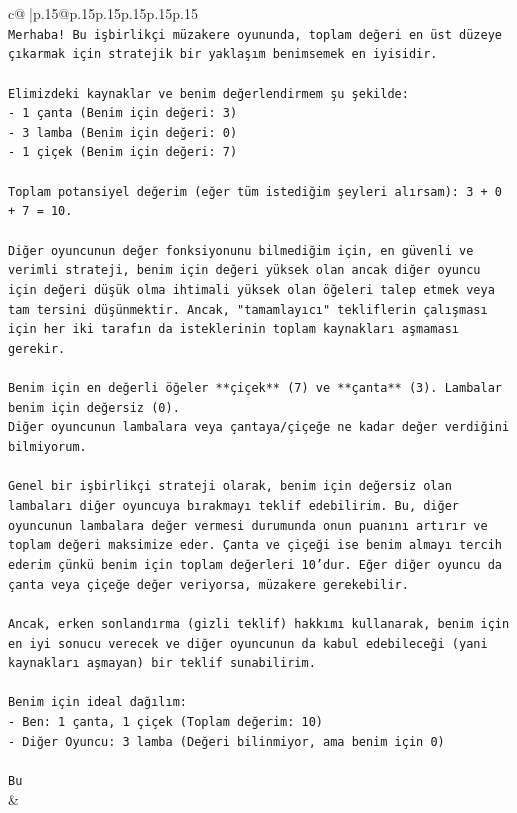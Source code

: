 \documentclass{article}
\begin{document}
{\begin{supertabular}{c@{$\;$}|p{.15\linewidth}@{}p{.15\linewidth}p{.15\linewidth}p{.15\linewidth}p{.15\linewidth}p{.15\linewidth}}
{{{\\ 
\texttt{Merhaba! Bu işbirlikçi müzakere oyununda, toplam değeri en üst düzeye çıkarmak için stratejik bir yaklaşım benimsemek en iyisidir.} \\
\\ 
\texttt{Elimizdeki kaynaklar ve benim değerlendirmem şu şekilde:} \\
\texttt{{-} 1 çanta (Benim için değeri: 3)} \\
\texttt{{-} 3 lamba (Benim için değeri: 0)} \\
\texttt{{-} 1 çiçek (Benim için değeri: 7)} \\
\\ 
\texttt{Toplam potansiyel değerim (eğer tüm istediğim şeyleri alırsam): 3 + 0 + 7 = 10.} \\
\\ 
\texttt{Diğer oyuncunun değer fonksiyonunu bilmediğim için, en güvenli ve verimli strateji, benim için değeri yüksek olan ancak diğer oyuncu için değeri düşük olma ihtimali yüksek olan öğeleri talep etmek veya tam tersini düşünmektir. Ancak, "tamamlayıcı" tekliflerin çalışması için her iki tarafın da isteklerinin toplam kaynakları aşmaması gerekir.} \\
\\ 
\texttt{Benim için en değerli öğeler **çiçek** (7) ve **çanta** (3). Lambalar benim için değersiz (0).} \\
\texttt{Diğer oyuncunun lambalara veya çantaya/çiçeğe ne kadar değer verdiğini bilmiyorum.} \\
\\ 
\texttt{Genel bir işbirlikçi strateji olarak, benim için değersiz olan lambaları diğer oyuncuya bırakmayı teklif edebilirim. Bu, diğer oyuncunun lambalara değer vermesi durumunda onun puanını artırır ve toplam değeri maksimize eder. Çanta ve çiçeği ise benim almayı tercih ederim çünkü benim için toplam değerleri 10'dur. Eğer diğer oyuncu da çanta veya çiçeğe değer veriyorsa, müzakere gerekebilir.} \\
\\ 
\texttt{Ancak, erken sonlandırma (gizli teklif) hakkımı kullanarak, benim için en iyi sonucu verecek ve diğer oyuncunun da kabul edebileceği (yani kaynakları aşmayan) bir teklif sunabilirim.} \\
\\ 
\texttt{Benim için ideal dağılım:} \\
\texttt{{-} Ben: 1 çanta, 1 çiçek (Toplam değerim: 10)} \\
\texttt{{-} Diğer Oyuncu: 3 lamba (Değeri bilinmiyor, ama benim için 0)} \\
\\ 
\texttt{Bu} \\
            }
        }
    }
    & \\ \\


\end{supertabular}}
\end{document}
